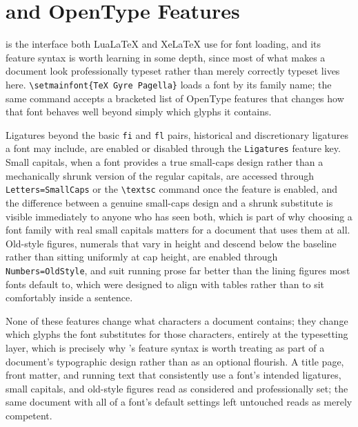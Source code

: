 \hypertarget{fontspec-and-opentype-features}{%
\section{\texorpdfstring{ and OpenType Features}{fontspec and OpenType Features}}\label{fontspec-and-opentype-features}}

 is the interface both LuaLaTeX and XeLaTeX use for font loading, and its feature syntax is worth learning in some depth, since most of what makes a document look professionally typeset rather than merely correctly typeset lives here. \texttt{\textbackslash{}setmainfont\{TeX\ Gyre\ Pagella\}} loads a font by its family name; the same command accepts a bracketed list of OpenType features that changes how that font behaves well beyond simply which glyphs it contains.

Ligatures beyond the basic \texttt{fi} and \texttt{fl} pairs, historical and discretionary ligatures a font may include, are enabled or disabled through the \texttt{Ligatures} feature key. Small capitals, when a font provides a true small-caps design rather than a mechanically shrunk version of the regular capitals, are accessed through \texttt{Letters=SmallCaps} or the \texttt{\textbackslash{}textsc} command once the feature is enabled, and the difference between a genuine small-caps design and a shrunk substitute is visible immediately to anyone who has seen both, which is part of why choosing a font family with real small capitals matters for a document that uses them at all. Old-style figures, numerals that vary in height and descend below the baseline rather than sitting uniformly at cap height, are enabled through \texttt{Numbers=OldStyle}, and suit running prose far better than the lining figures most fonts default to, which were designed to align with tables rather than to sit comfortably inside a sentence.

None of these features change what characters a document contains; they change which glyphs the font substitutes for those characters, entirely at the typesetting layer, which is precisely why 's feature syntax is worth treating as part of a document's typographic design rather than as an optional flourish. A title page, front matter, and running text that consistently use a font's intended ligatures, small capitals, and old-style figures read as considered and professionally set; the same document with all of a font's default settings left untouched reads as merely competent.

